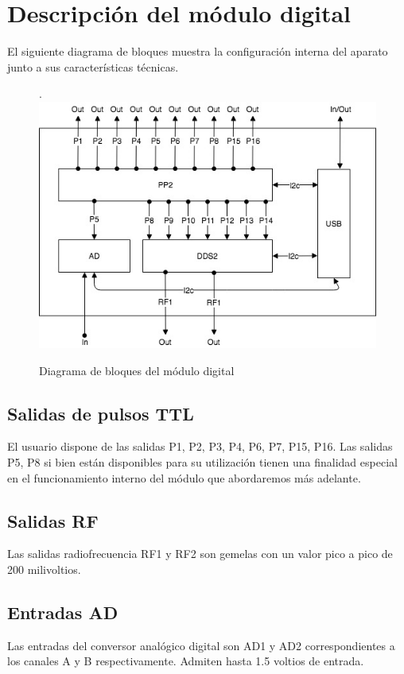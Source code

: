 \section{Descripci\'on del m\'odulo digital}

El siguiente diagrama de bloques muestra la configuraci\'on interna 
del aparato junto a sus caracter\'isticas t\'ecnicas.

\begin{figure}[!htb].
    \includegraphics[width=\linewidth]{../figures/d6.jpg}
    \caption{Diagrama de bloques del m\'odulo digital}
    \label{fig:d6}
\end{figure}

\subsection{Salidas de pulsos TTL}
El usuario dispone de las salidas P1, P2, P3, P4, P6, P7, P15, P16. 
Las salidas P5, P8 si bien est\'an disponibles para su utilizaci\'on tienen 
una finalidad especial en el funcionamiento interno del m\'odulo que abordaremos m\'as 
adelante.

\subsection{Salidas RF}
Las salidas radiofrecuencia RF1 y RF2 son gemelas con un valor pico a pico de 200 milivoltios.

\subsection{Entradas AD}
Las entradas del conversor anal\'ogico digital son AD1 y AD2 correspondientes a los canales A y B respectivamente.
Admiten hasta 1.5 voltios de entrada.

\newpage
